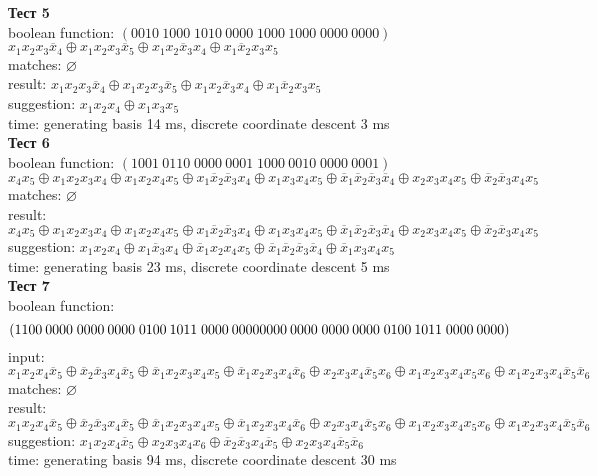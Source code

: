 \documentclass[a4paper,12pt,titlepage,finall]{article}
\begin{document}
\textbf{Тест 5}
\\boolean function: $(0010\:1000\;1010\:0000\;1000\:1000\;0000\:0000)$
\: $x_1 x_2 x_3 \overline x_4 \oplus x_1 x_2 x_3 \overline x_5 \oplus x_1 x_2 \overline x_3 x_4 \oplus x_1 \overline x_2 x_3 x_5$
\\matches: $\varnothing$
\\result: $x_1 x_2 x_3 \overline x_4 \oplus x_1 x_2 x_3 \overline x_5 \oplus x_1 x_2 \overline x_3 x_4 \oplus x_1 \overline x_2 x_3 x_5$
\\suggestion: $x_1 x_2 x_4 \oplus x_1 x_3 x_5$
\\time: generating basis 14 ms, discrete coordinate descent 3 ms\\

\textbf{Тест 6}
\\boolean function: $(1001\:0110\;0000\:0001\;1000\:0010\;0000\:0001)$
\: $x_4 x_5 \oplus x_1 x_2 x_3 x_4 \oplus x_1 x_2 x_4 x_5 \oplus x_1 \overline x_2 \overline x_3 x_4 \oplus x_1 x_3 x_4 x_5 \oplus \overline x_1 \overline x_2 \overline x_3 \overline x_4 \oplus x_2 x_3 x_4 x_5 \oplus \overline x_2 \overline x_3 x_4 x_5$
\\matches: $\varnothing$
\\result: $x_4 x_5 \oplus x_1 x_2 x_3 x_4 \oplus x_1 x_2 x_4 x_5 \oplus x_1 \overline x_2 \overline x_3 x_4 \oplus x_1 x_3 x_4 x_5 \oplus \overline x_1 \overline x_2 \overline x_3 \overline x_4 \oplus x_2 x_3 x_4 x_5 \oplus \overline x_2 \overline x_3 x_4 x_5$
\\suggestion: $x_1 x_2 x_4 \oplus x_1 \overline x_3 x_4 \oplus \overline x_1 x_2 x_4 x_5 \oplus \overline x_1 \overline x_2 \overline x_3 \overline x_4 \oplus \overline x_1 x_3 x_4 x_5$
\\time: generating basis 23 ms, discrete coordinate descent 5 ms\\

\textbf{Тест 7}
\\boolean function: $$(1100\:0000\;0000\:0000\;0100\:1011\;0000\:0000\\0000\:0000\;0000\:0000\;0100\:1011\;0000\:0000)$$
input: $x_1 x_2 x_4 \overline x_5 \oplus \overline x_2 \overline x_3 x_4 \overline x_5 \oplus \overline x_1 x_2 x_3 x_4 x_5 \oplus \overline x_1 x_2 x_3 x_4 \overline x_6 \oplus x_2 x_3 x_4 \overline x_5 x_6 \oplus x_1 x_2 x_3 x_4 x_5 x_6 \oplus x_1 x_2 x_3 x_4 \overline x_5 \overline x_6$
\\matches: $\varnothing$
\\result: $x_1 x_2 x_4 \overline x_5 \oplus \overline x_2 \overline x_3 x_4 \overline x_5 \oplus \overline x_1 x_2 x_3 x_4 x_5 \oplus \overline x_1 x_2 x_3 x_4 \overline x_6 \oplus x_2 x_3 x_4 \overline x_5 x_6 \oplus x_1 x_2 x_3 x_4 x_5 x_6 \oplus x_1 x_2 x_3 x_4 \overline x_5 \overline x_6$
\\suggestion: $x_1 x_2 x_4 \overline x_5 \oplus x_2 x_3 x_4 x_6 \oplus \overline x_2 \overline x_3 x_4 \overline x_5 \oplus x_2 x_3 x_4 \overline x_5 \overline x_6$
\\time: generating basis 94 ms, discrete coordinate descent 30 ms\\
\end{document}
